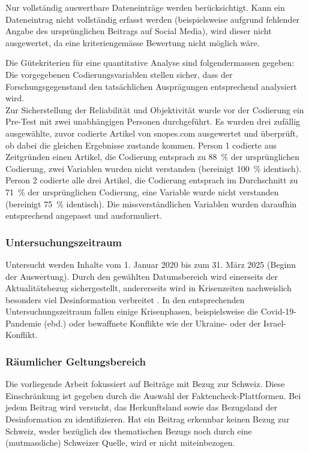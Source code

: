 \documentclass[12pt,a4paper]{article}        %
\begin{document}
Nur vollständig auswertbare Dateneinträge werden berücksichtigt. Kann ein Dateneintrag nicht vollständig erfasst werden (beispielsweise aufgrund fehlender Angabe des ursprünglichen Beitrags auf Social Media), wird dieser nicht ausgewertet, da eine kriteriengemässe Bewertung nicht möglich wäre.

Die Gütekriterien für eine quantitative Analyse sind folgendermassen gegeben: Die vorgegebenen Codierungsvariablen stellen sicher, dass der Forschungsgegenstand den tatsächlichen Ausprägungen entsprechend analysiert wird.\\
Zur Sicherstellung der Reliabilität und Objektivität wurde vor der Codierung ein Pre-Test mit zwei unabhängigen Personen durchgeführt. Es wurden drei zufällig ausgewählte, zuvor codierte Artikel von snopes.com ausgewertet und überprüft, ob dabei die gleichen Ergebnisse zustande kommen. Person 1 codierte aus Zeitgründen einen Artikel, die Codierung entsprach zu 88~\% der ursprünglichen Codierung, zwei Variablen wurden nicht verstanden (bereinigt 100~\% identisch). Person 2 codierte alle drei Artikel, die Codierung entsprach im Durchschnitt zu 71~\% der ursprünglichen Codierung, eine Variable wurde nicht verstanden (bereinigt 75~\% identisch). Die missverständlichen Variablen wurden daraufhin entsprechend angepasst und ausformuliert.

\subsubsection{Untersuchungszeitraum}
Untersucht werden Inhalte vom 1. Januar 2020 bis zum 31. März 2025 (Beginn der Auswertung). Durch den gewählten Datumsbereich wird einerseits der Aktualitätsbezug sichergestellt, andererseits wird in Krisenzeiten nachweislich besonders viel Desinformation verbreitet \parencites{tandoc_jr_defining_2018}[Lim \& Ling (2018) zit.\ nach][2]{ceron_fake_2021}. In den entsprechenden Untersuchungszeitraum fallen einige Krisenphasen, beispielsweise die Covid-19-Pandemie (ebd.) oder bewaffnete Konflikte wie der Ukraine- oder der Israel-Konflikt.

\subsubsection{Räumlicher Geltungsbereich}
Die vorliegende Arbeit fokussiert auf Beiträge mit Bezug zur Schweiz. Diese Einschränkung ist gegeben durch die Auswahl der Faktencheck-Plattformen. Bei jedem Beitrag wird versucht, das Herkunftsland sowie das Bezugsland der Desinformation zu identifizieren. Hat ein Beitrag erkennbar keinen Bezug zur Schweiz, weder bezüglich des thematischen Bezugs noch durch eine (mutmassliche) Schweizer Quelle, wird er nicht miteinbezogen.
\end{document}
